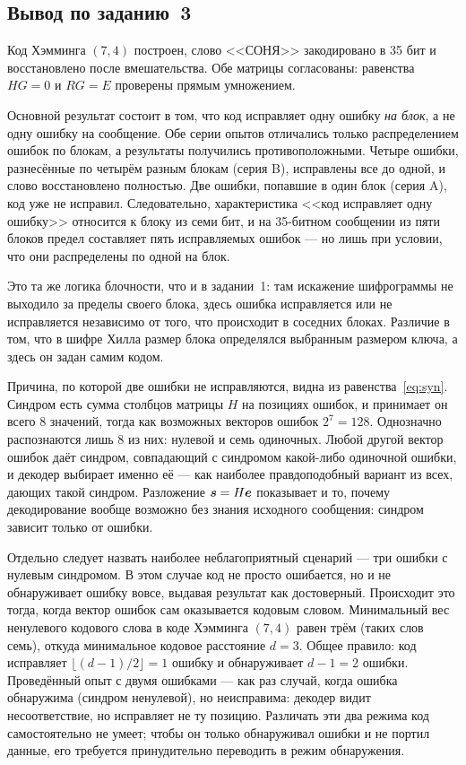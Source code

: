 \documentclass[a4paper,14pt]{extarticle}
\begin{document}
\subsection*{Вывод по заданию~3}

Код Хэмминга $(7,4)$ построен, слово <<СОНЯ>> закодировано в 35 бит и восстановлено
после вмешательства. Обе матрицы согласованы: равенства $HG = 0$ и $RG = E$ проверены
прямым умножением.

Основной результат состоит в том, что код исправляет одну ошибку \emph{на блок}, а не
одну ошибку на сообщение. Обе серии опытов отличались только распределением ошибок по
блокам, а результаты получились противоположными. Четыре ошибки, разнесённые по
четырём разным блокам (серия B), исправлены все до одной, и слово восстановлено
полностью. Две ошибки, попавшие в один блок (серия A), код уже не исправил.
Следовательно, характеристика <<код исправляет одну ошибку>> относится к блоку из семи
бит, и на 35-битном сообщении из пяти блоков предел составляет пять исправляемых
ошибок --- но лишь при условии, что они распределены по одной на блок.

Это та же логика блочности, что и в задании~1: там искажение шифрограммы не выходило
за пределы своего блока, здесь ошибка исправляется или не исправляется независимо от
того, что происходит в соседних блоках. Различие в том, что в шифре Хилла размер блока
определялся выбранным размером ключа, а здесь он задан самим кодом.

Причина, по которой две ошибки не исправляются, видна из равенства~\eqref{eq:syn}.
Синдром есть сумма столбцов матрицы $H$ на позициях ошибок, и принимает он всего 8
значений, тогда как возможных векторов ошибок $2^7 = 128$. Однозначно распознаются
лишь 8 из них: нулевой и семь одиночных. Любой другой вектор ошибок даёт синдром,
совпадающий с синдромом какой-либо одиночной ошибки, и декодер выбирает именно её ---
как наиболее правдоподобный вариант из всех, дающих такой синдром. Разложение
$\boldsymbol{s} = H\boldsymbol{e}$ показывает и то, почему декодирование вообще возможно без знания
исходного сообщения: синдром зависит только от ошибки.

Отдельно следует назвать наиболее неблагоприятный сценарий --- три ошибки с нулевым
синдромом. В этом случае код не просто ошибается, но и не обнаруживает ошибку вовсе,
выдавая результат как достоверный. Происходит это тогда, когда вектор ошибок сам
оказывается кодовым словом. Минимальный вес ненулевого кодового слова в коде Хэмминга
$(7,4)$ равен трём (таких слов семь), откуда минимальное кодовое расстояние $d = 3$.
Общее правило: код исправляет $\lfloor (d-1)/2 \rfloor = 1$ ошибку и обнаруживает
$d - 1 = 2$ ошибки. Проведённый опыт с двумя ошибками --- как раз случай, когда ошибка
обнаружима (синдром ненулевой), но неисправима: декодер видит несоответствие, но
исправляет не ту позицию. Различать эти два режима код самостоятельно не умеет; чтобы
он только обнаруживал ошибки и не портил данные, его требуется принудительно переводить
в режим обнаружения.
\end{document}
